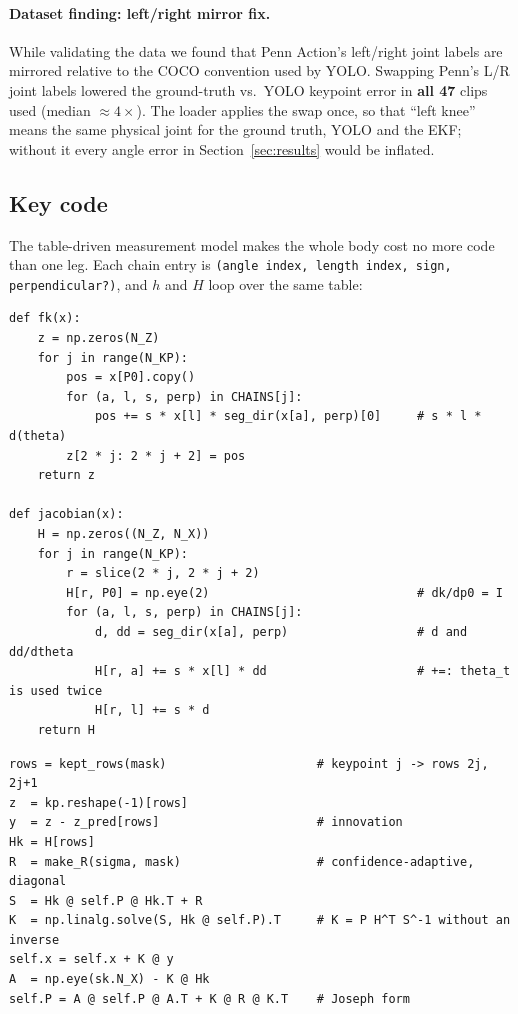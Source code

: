 \documentclass[12pt,a4paper]{article}
\begin{document}
\paragraph{Dataset finding: left/right mirror fix.} While validating the data we found that Penn
Action's left/right joint labels are mirrored relative to the COCO convention used by YOLO. Swapping Penn's
L/R joint labels lowered the ground-truth vs.\ YOLO keypoint error in \textbf{all 47} clips used (median
$\approx4\times$).
The loader applies the swap once, so that ``left knee'' means the same physical joint for the ground truth,
YOLO and the EKF; without it every angle error in Section~\ref{sec:results} would be inflated.

\subsection{Key code}

The table-driven measurement model makes the whole body cost no more code than one leg. Each chain entry is
\texttt{(angle index, length index, sign, perpendicular?)}, and $h$ and $H$ loop over the same table:
\begin{lstlisting}[caption={Forward kinematics $h(\mathbf{x})$ and analytic Jacobian $H$ (\texttt{ekf/skeleton.py}).}, label=lst:fk, basicstyle={\ttfamily\scriptsize\bfseries\color[RGB]{30,30,30}}]
def fk(x):
    z = np.zeros(N_Z)
    for j in range(N_KP):
        pos = x[P0].copy()
        for (a, l, s, perp) in CHAINS[j]:
            pos += s * x[l] * seg_dir(x[a], perp)[0]     # s * l * d(theta)
        z[2 * j: 2 * j + 2] = pos
    return z

def jacobian(x):
    H = np.zeros((N_Z, N_X))
    for j in range(N_KP):
        r = slice(2 * j, 2 * j + 2)
        H[r, P0] = np.eye(2)                             # dk/dp0 = I
        for (a, l, s, perp) in CHAINS[j]:
            d, dd = seg_dir(x[a], perp)                  # d and dd/dtheta
            H[r, a] += s * x[l] * dd                     # +=: theta_t is used twice
            H[r, l] += s * d
    return H
\end{lstlisting}

\begin{lstlisting}[caption={Measurement update on the rows that survived masking and gating (\texttt{ekf/ekf.py}).}, label=lst:update, basicstyle={\ttfamily\scriptsize\bfseries\color[RGB]{30,30,30}}]
rows = kept_rows(mask)                     # keypoint j -> rows 2j, 2j+1
z  = kp.reshape(-1)[rows]
y  = z - z_pred[rows]                      # innovation
Hk = H[rows]
R  = make_R(sigma, mask)                   # confidence-adaptive, diagonal
S  = Hk @ self.P @ Hk.T + R
K  = np.linalg.solve(S, Hk @ self.P).T     # K = P H^T S^-1 without an inverse
self.x = self.x + K @ y
A  = np.eye(sk.N_X) - K @ Hk
self.P = A @ self.P @ A.T + K @ R @ K.T    # Joseph form
\end{lstlisting}
\end{document}
